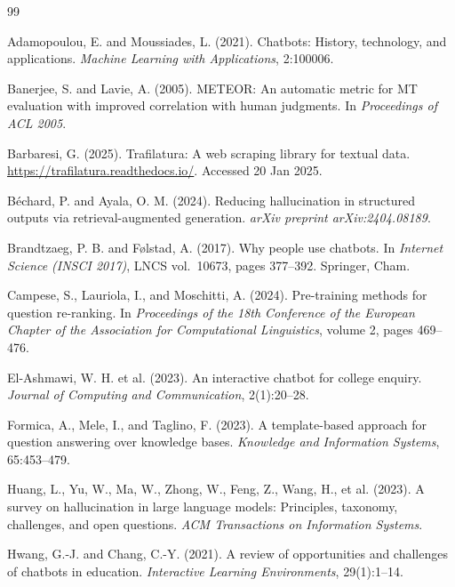 \documentclass[a4paper,twoside]{article}
\begin{document}
{\small
\begin{thebibliography}{99}

 Adamopoulou, E. and Moussiades, L. (2021). Chatbots: History, technology, and applications. \textit{Machine Learning with Applications}, 2:100006.

 Banerjee, S. and Lavie, A. (2005). METEOR: An automatic metric for MT evaluation with improved correlation with human judgments. In \textit{Proceedings of ACL 2005}.

 Barbaresi, G. (2025). Trafilatura: A web scraping library for textual data. \url{https://trafilatura.readthedocs.io/}. Accessed 20 Jan 2025.

 B\'echard, P. and Ayala, O. M. (2024). Reducing hallucination in structured outputs via retrieval-augmented generation. \textit{arXiv preprint arXiv:2404.08189}.

 Brandtzaeg, P. B. and F{\o}lstad, A. (2017). Why people use chatbots. In \textit{Internet Science (INSCI 2017)}, LNCS vol.\ 10673, pages 377--392. Springer, Cham.

 Campese, S., Lauriola, I., and Moschitti, A. (2024). Pre-training methods for question re-ranking. In \textit{Proceedings of the 18th Conference of the European Chapter of the Association for Computational Linguistics}, volume 2, pages 469--476.

 El-Ashmawi, W. H. et al. (2023). An interactive chatbot for college enquiry. \textit{Journal of Computing and Communication}, 2(1):20--28.

 Formica, A., Mele, I., and Taglino, F. (2023). A template-based approach for question answering over knowledge bases. \textit{Knowledge and Information Systems}, 65:453--479.

 Huang, L., Yu, W., Ma, W., Zhong, W., Feng, Z., Wang, H., et al. (2023). A survey on hallucination in large language models: Principles, taxonomy, challenges, and open questions. \textit{ACM Transactions on Information Systems}.

 Hwang, G.-J. and Chang, C.-Y. (2021). A review of opportunities and challenges of chatbots in education. \textit{Interactive Learning Environments}, 29(1):1--14.


\end{thebibliography}}
\end{document}
